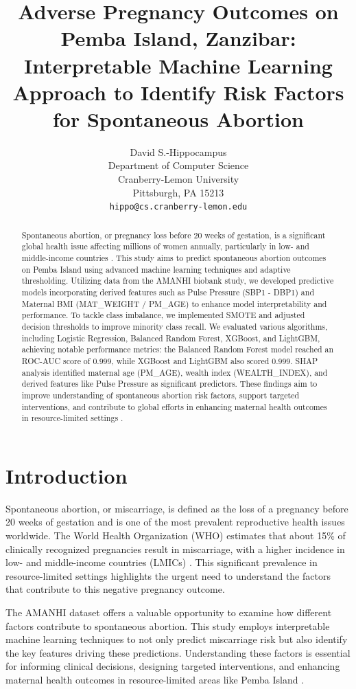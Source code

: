 \documentclass{article}
\title{Adverse Pregnancy Outcomes on Pemba Island, Zanzibar: Interpretable Machine Learning Approach to Identify Risk Factors for Spontaneous Abortion}
\author{%
 David S.-Hippocampus \\
 Department of Computer Science \\
 Cranberry-Lemon University \\
 Pittsburgh, PA 15213 \\
 \texttt{hippo@cs.cranberry-lemon.edu}
}
\begin{document}
\maketitle

\begin{abstract}
Spontaneous abortion, or pregnancy loss before 20 weeks of gestation, is a significant global health issue affecting millions of women annually, particularly in low- and middle-income countries \cite{aftab2021}. This study aims to predict spontaneous abortion outcomes on Pemba Island using advanced machine learning techniques and adaptive thresholding. Utilizing data from the AMANHI biobank study, we developed predictive models incorporating derived features such as Pulse Pressure (SBP1 - DBP1) and Maternal BMI (MAT\_WEIGHT / PM\_AGE) to enhance model interpretability and performance. To tackle class imbalance, we implemented SMOTE and adjusted decision thresholds to improve minority class recall. We evaluated various algorithms, including Logistic Regression, Balanced Random Forest, XGBoost, and LightGBM, achieving notable performance metrics: the Balanced Random Forest model reached an ROC-AUC score of 0.999, while XGBoost and LightGBM also scored 0.999. SHAP analysis identified maternal age (PM\_AGE), wealth index (WEALTH\_INDEX), and derived features like Pulse Pressure as significant predictors. These findings aim to improve understanding of spontaneous abortion risk factors, support targeted interventions, and contribute to global efforts in enhancing maternal health outcomes in resource-limited settings \cite{aljameel2023}.
\end{abstract}

\section{Introduction}
Spontaneous abortion, or miscarriage, is defined as the loss of a pregnancy before 20 weeks of gestation and is one of the most prevalent reproductive health issues worldwide. The World Health Organization (WHO) estimates that about 15\% of clinically recognized pregnancies result in miscarriage, with a higher incidence in low- and middle-income countries (LMICs) \cite{buss2006}. This significant prevalence in resource-limited settings highlights the urgent need to understand the factors that contribute to this negative pregnancy outcome.

The AMANHI dataset offers a valuable opportunity to examine how different factors contribute to spontaneous abortion. This study employs interpretable machine learning techniques to not only predict miscarriage risk but also identify the key features driving these predictions. Understanding these factors is essential for informing clinical decisions, designing targeted interventions, and enhancing maternal health outcomes in resource-limited areas like Pemba Island \cite{aftab2021}.
\end{document}
